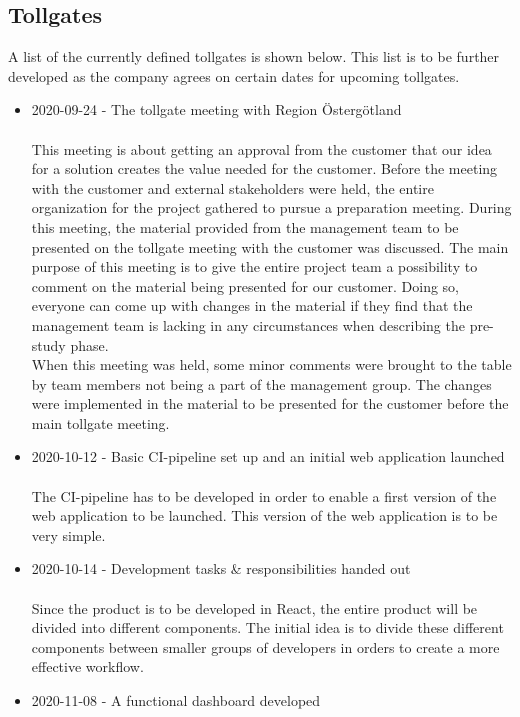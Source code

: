 \newpage
\subsection{Tollgates}
A list of the currently defined tollgates is shown below. This list is to be further developed as the company agrees on certain dates for upcoming tollgates.
\begin{itemize}
    \item 2020-09-24 - The tollgate meeting with Region Östergötland\\ \\
    This meeting is about getting an approval from the customer that our idea for a solution creates the value needed for the customer. Before the meeting with the customer and external stakeholders were held, the entire organization for the project gathered to pursue a preparation meeting. During this meeting, the material provided from the management team to be presented on the tollgate meeting with the customer was discussed. The main purpose of this meeting is to give the entire project team a possibility to comment on the material being presented for our customer. Doing so, everyone can come up with changes in the material if they find that the management team is lacking in any circumstances when describing the pre-study phase. \\
    When this meeting was held, some minor comments were brought to the table by team members not being a part of the management group. The changes were implemented in the material to be presented for the customer before the main tollgate meeting. 
    \item 2020-10-12 - Basic CI-pipeline set up and an initial web application launched\\ \\
    The CI-pipeline has to be developed in order to enable a first version of the web application to be launched. This version of the web application is to be very simple. 
    \item 2020-10-14 - Development tasks \& responsibilities handed out \\ \\
    Since the product is to be developed in React, the entire product will be divided into different components. The initial idea is to divide these different components between smaller groups of developers in orders to create a more effective workflow.
    \item 2020-11-08 - A functional dashboard developed \\ \\

\end{itemize}
